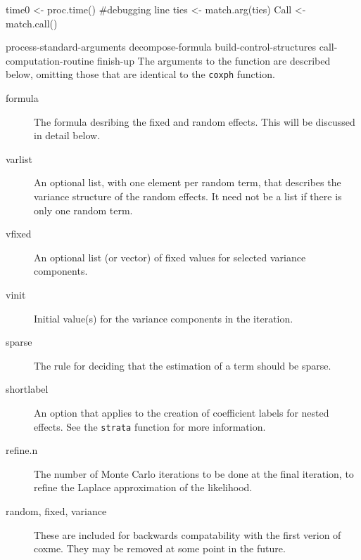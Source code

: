 \documentclass{article}
\begin{document}
    time0 <- proc.time()    #debugging line
    ties <- match.arg(ties)
    Call <- match.call()

    \LA{}process-standard-arguments\RA{}
    \LA{}decompose-formula\RA{}
    \LA{}build-control-structures\RA{}
    \LA{}call-computation-routine\RA{}
    \LA{}finish-up\RA{}
\eatline
\nwendcode{}\nwdocspar
The arguments to the function are described below,
omitting those that are identical to the {\tt{}coxph} function.
\begin{description}
\item[formula] The formula desribing the fixed and random effects.  This
will be discussed in detail below.
\item[varlist] An optional list, with one element per random term, that
describes the variance structure of the random effects.  It need not
be a list if there is only one random term.
\item[vfixed] An optional list (or vector) of fixed values for 
selected variance
components.  
\item[vinit] Initial value(s) for the variance components in the iteration.
\item[sparse] The rule for deciding that the estimation of a term should be
sparse.  
\item[shortlabel] An option that applies to the creation of coefficient
labels for nested effects.  See the {\tt{}strata} function for more
information.
\item[refine.n] The number of Monte Carlo iterations to be done at the final
iteration, to refine the Laplace approximation of the likelihood.
\item[random, fixed, variance] These are included for backwards compatability 
with the first verion of coxme.  They may be removed at some
point in the future.
\end{description}
\end{document}

